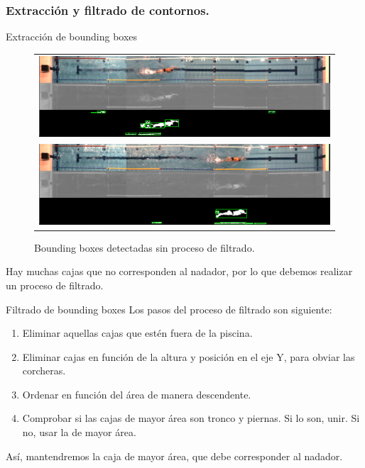 \documentclass[11pt]{beamer}
\begin{document}
        \subsubsection{Extracción y filtrado de contornos.}
        \begin{frame}{Extracción de bounding boxes}
            \begin{figure}[h!]
                \centering
                    \begin{tabular}{c}
                        \includegraphics[scale=0.17]{imagenes/MUCHOS_CONTORNOS_I.png} \\
                        \includegraphics[scale=0.17]{imagenes/MUCHOS_CONTORNOS_III.png} 
                    \end{tabular}
                \caption{Bounding boxes detectadas sin proceso de filtrado.}
                \label{fig:muchoscontornos}
            \end{figure}
            Hay muchas cajas que no corresponden al nadador, por lo que debemos realizar un proceso de filtrado.
        \end{frame}
        
        \begin{frame}{Filtrado de bounding boxes}
        Los pasos del proceso de filtrado son siguiente:
            \begin{enumerate}
                \item Eliminar aquellas cajas que estén fuera de la piscina.
                \item Eliminar cajas en función de la altura y posición en el eje Y, para obviar las corcheras.
                \item Ordenar en función del área de manera descendente.
                \item Comprobar si las cajas de mayor área son tronco y piernas. Si lo son, unir. Si no, usar la de mayor área.
            \end{enumerate}
        Así, mantendremos la caja de mayor área, que debe corresponder al nadador.
        \end{frame}
        
\end{document}
